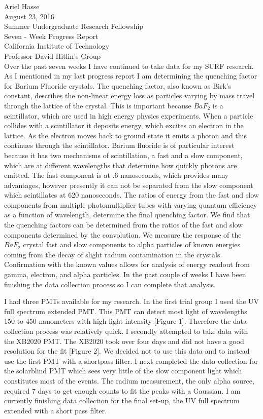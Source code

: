 \documentclass{article}
\begin{document}
\noindent 
Ariel Hasse\\
August 23, 2016\\
Summer Undergraduate Research Fellowship\\
Seven - Week Progress Report\\
California Institute of Technology\\
Professor David Hitlin’s Group\\



Over the past seven weeks I have continued to take data for my SURF research. As I mentioned in my last progress report I am determining the quenching factor for Barium Fluoride crystals. The quenching factor, also known as Birk's constant, describes the non-linear energy loss as particles varying by mass travel through the lattice of the crystal. This is important because $BaF_2$ is a scintillator, which are used in high energy physics experiments. When a particle collides with a scintillator it deposits energy, which excites an electron in the lattice. As the electron moves back to ground state it emits a photon and this continues through the scintillator. Barium fluoride is of particular interest because it has two mechanisms of scintillation, a fast and a slow component, which are at different wavelengths that determine how quickly photons are emitted. The fast component is at .6 nanoseconds, which provides many advantages, however presently it can not be separated from the slow component which scintillates at 620 nanoseconds. The ratios of energy from the fast and slow components from multiple photomultiplier tubes with varying quantum efficiency as a function of wavelength, determine the final quenching factor.  We find that the quenching factors can be determined from the ratios of the fast and slow components determined by the convolution. We measure the response of the $BaF_2$ crystal fast and slow components to alpha particles of known energies coming from the decay of slight radium contamination in the crystals. Confirmation with the known values allows for analysis of energy readout from gamma, electron, and alpha particles. In the past couple of weeks I have been finishing the data collection process so I can complete that analysis. 

I had three PMTs available for my research. In the first trial group I used the UV full spectrum extended PMT. This PMT can detect most light of wavelengths 150 to 450 nanometers with high light intensity [Figure 1]. Therefore the data collection process was relatively quick. I secondly attempted to take data with the XB2020 PMT. The XB2020 took over four days and did not have a good resolution for the fit [Figure 2]. We decided not to use this data and to instead use the first PMT with a shortpass filter. I next completed the data collection for the solarblind PMT which sees very little of the slow component light which constitutes most of the events. The radium measurement, the only alpha source, required 7 days to get enough counts to fit the peaks with a Gaussian. I am currently finishing data collection for the final set-up, the UV full spectrum extended with a short pass filter.
\end{document}
